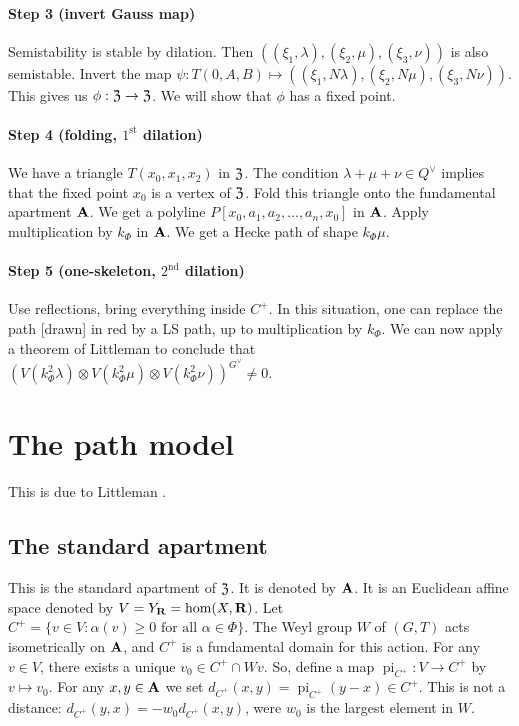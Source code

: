 \documentclass{article}
\begin{document}
\paragraph{Step 3 (invert Gauss map)}
Semistability is stable by dilation. Then 
$((\xi_1,\lambda),(\xi_2,\mu),(\xi_3,\nu))$ is also semistable. Invert the 
map $\psi:T(0,A,B)\mapsto ((\xi_1,N\lambda),(\xi_2,N\mu),(\xi_3,N\nu))$. 
This gives us $\phi:\mathfrak{Z}\to \mathfrak{Z}$. We will show that $\phi$ has a fixed point. 

\paragraph{Step 4 (folding, $1^\mathrm{st}$ dilation)}
We have a triangle $T(x_0,x_1,x_2)$ in $\mathfrak{Z}$. The condition 
$\lambda+\mu+\nu\in Q^\vee$ implies that the fixed point $x_0$ is a vertex of 
$\mathfrak{Z}$. Fold this triangle onto the fundamental apartment $\mathbf{A}$. We get a 
polyline $P[x_0,a_1,a_2,\dots,a_n,x_0]$ in $\mathbf{A}$. Apply multiplication by 
$k_\Phi$ in $\mathbf{A}$. We get a Hecke path of shape $k_\Phi \mu$. 

\paragraph{Step 5 (one-skeleton, $2^\mathrm{nd}$ dilation)}
Use reflections, bring everything inside $C^+$. In this situation, one can 
replace the path [drawn] in red by a LS path, up to multiplication by 
$k_\Phi$. We can now apply a theorem of Littleman to conclude that 
$(V( k_\Phi^2 \lambda)\otimes V(k_\Phi^2\mu)\otimes V(k_\Phi^2 \nu))^{G^\vee}\ne 0$. 





\section{The path model}

This is due to Littleman \cite{l94}. 


\subsection{The standard apartment}

This is the standard apartment of $\mathfrak{Z}$. It is denoted by $\mathbf{A}$. It is an 
Euclidean affine space denoted by $V=Y_{\mathbf{R}} = \hom(X,\mathbf{R})$. Let 
$C^+=\{v\in V:\alpha(v)\geqslant 0\text{ for all }\alpha\in \Phi\}$. The Weyl 
group $W$ of $(G,T)$ acts isometrically on $\mathbf{A}$, and $C^+$ is a fundamental 
domain for this action. For any $v\in V$, there exists a unique 
$v_0\in C^+\cap W v$. So, define a map $\operatorname{pi}_{C^+}:V\to C^+$ by 
$v\mapsto v_0$. For any $x,y\in \mathbf{A}$ we set 
$d_{C^+}(x,y) = \operatorname{pi}_{C^+}(y-x)\in C^+$. This is not a distance: 
$d_{C^+}(y,x) = - w_0 d_{C^+}(x,y)$, were $w_0$ is the largest element in $W$. 
\end{document}
